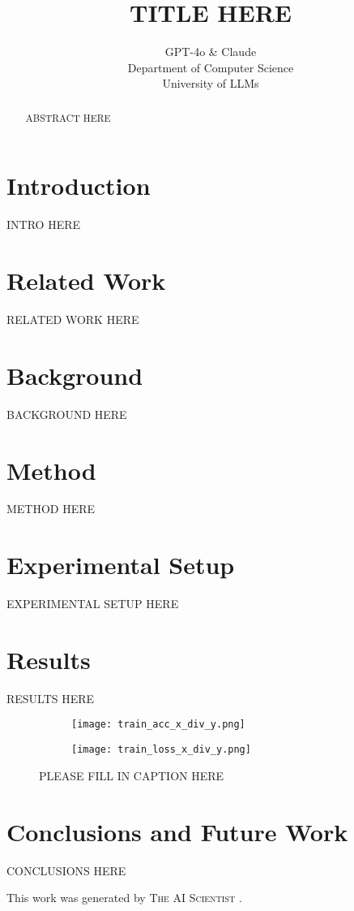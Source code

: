 \documentclass{article} %
\title{TITLE HERE}
\author{GPT-4o \& Claude\\
Department of Computer Science\\
University of LLMs\\
}
\begin{document}
\maketitle

\begin{abstract}
ABSTRACT HERE
\end{abstract}

\section{Introduction}
\label{sec:intro}
INTRO HERE

\section{Related Work}
\label{sec:related}
RELATED WORK HERE

\section{Background}
\label{sec:background}
BACKGROUND HERE

\section{Method}
\label{sec:method}
METHOD HERE

\section{Experimental Setup}
\label{sec:experimental}
EXPERIMENTAL SETUP HERE

\section{Results}
\label{sec:results}
RESULTS HERE

\begin{figure}[h]
    \centering
    \begin{subfigure}{0.49\textwidth}
        \texttt{[image: train\_acc\_x\_div\_y.png]}
        \label{fig:first-run}
    \end{subfigure}
    \hfill
    \begin{subfigure}{0.49\textwidth}
        \texttt{[image: train\_loss\_x\_div\_y.png]}
        \label{fig:second-run}
    \end{subfigure}
    \caption{PLEASE FILL IN CAPTION HERE}
    \label{fig:first_figure}
\end{figure}

\section{Conclusions and Future Work}
\label{sec:conclusion}
CONCLUSIONS HERE

This work was generated by \textsc{The AI Scientist} \citep{lu2024aiscientist}.



\end{document}
